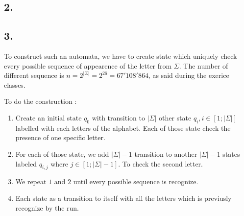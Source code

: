 \documentclass[a4paper,11pt]{report}
\begin{document}
\subsection*{2.}

\begin{center}
\end{center}

\subsection*{3.}

To construct such an automata, we have to create state which uniquely check
every possible sequence of appearence of the letter from $\Sigma$. The number of
different sequence is $n = 2^{|\Sigma|} = 2^{26} = 67'108'864$, as said during
the exerice classes.

To do the construction :
\begin{enumerate}
\item Create an initial state $q_0$ with transition to $|\Sigma|$ other state
  $q_i, i \in [1;|\Sigma|]$ labelled with each letters of the alphabet. Each of
  those state check the presence of one specific letter.
\item For each of those state, we add $|\Sigma|-1$ transition to another
  $|\Sigma|-1$ states labeled $q_{i,j}$ where $j \in [1;|\Sigma|-1]$. To check
  the second letter.
\item We repeat $1$ and $2$ until every possible sequence is recognize.
\item Each state as a transition to itself with all the letters which is
  previusly recognize by the run.
\end{enumerate}
\end{document}

